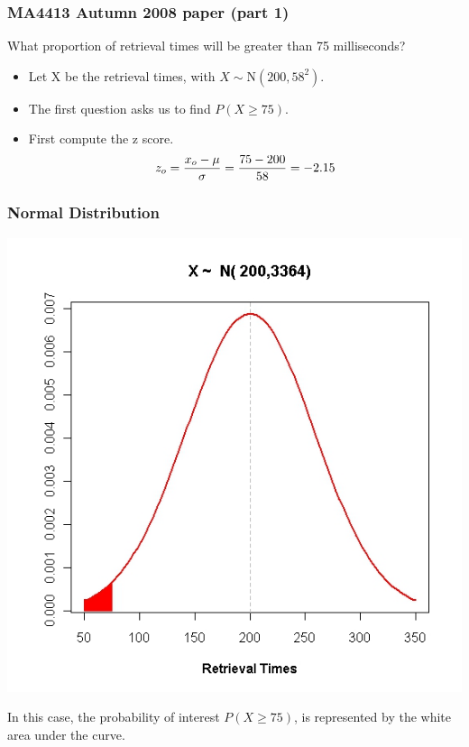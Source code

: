 \documentclass[IntroMain.tex]{subfiles}
\begin{document}
\begin{frame}
\frametitle{MA4413 Autumn 2008 paper (part 1)}
What proportion of retrieval times will be greater than 75 milliseconds?\\ \bigskip

\begin{itemize}
\item Let X be the retrieval times, with $X \sim \mbox{N}(200,58^2)$.\\
\item The first question asks us to find $P( X \geq 75)$. \\
\item First compute the z score.
\[ z_o =  {x_o - \mu \over \sigma} = {75 - 200 \over 58}  = -2.15 \]
\end{itemize}
\end{frame}
\begin{frame}
\frametitle{Normal Distribution}

\begin{center}
\includegraphics[width=0.7\linewidth]{images/5BNormal2}
\end{center}

In this case, the probability of interest $P(X\geq 75)$, is represented by the white area under the curve.

\end{frame}
\end{document}
